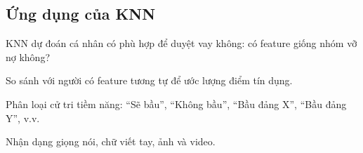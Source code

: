 \subsection{Ứng dụng của KNN}

\begin{ynghia}[title={Ngân hàng}]
KNN dự đoán cá nhân có phù hợp để duyệt vay không: có feature giống nhóm vỡ nợ không?
\end{ynghia}

\begin{ynghia}[title={Xếp hạng tín dụng}]
So sánh với người có feature tương tự để ước lượng điểm tín dụng.
\end{ynghia}

\begin{ynghia}[title={Chính trị}]
Phân loại cử tri tiềm năng: ``Sẽ bầu'', ``Không bầu'', ``Bầu đảng X'', ``Bầu đảng Y'', v.v.
\end{ynghia}

\begin{ynghia}[title={Lĩnh vực khác}]
Nhận dạng giọng nói, chữ viết tay, ảnh và video.
\end{ynghia}
